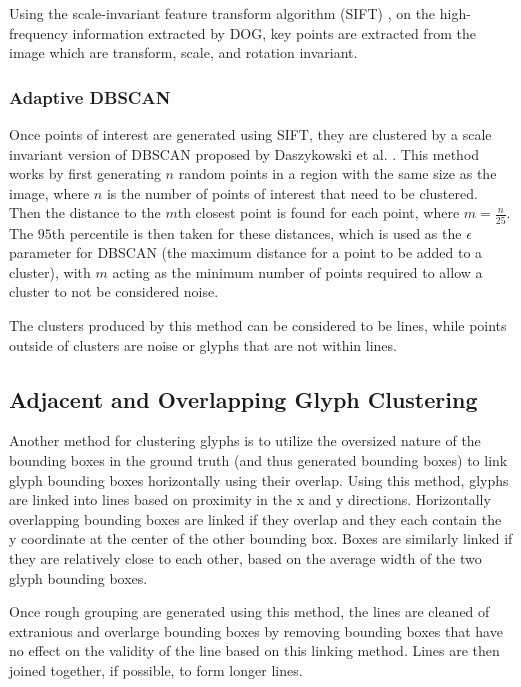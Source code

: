 Using the scale-invariant feature transform algorithm (SIFT) \cite{Lowe}, on the high-frequency information extracted by DOG, key points are extracted from the image which are transform, scale, and rotation invariant.


\subsubsection{Adaptive DBSCAN}

Once points of interest are generated using SIFT, they are clustered by a scale invariant version of DBSCAN proposed by Daszykowski et al. \cite{Daszykowski}. This method works by first generating $n$ random points in a region with the same size as the image, where $n$ is the number of points of interest that need to be clustered. Then the distance to the $m$th closest point is found for each point, where $m = \frac{n}{25}$. The $95$th percentile is then taken for these distances, which is used as the $\epsilon$ parameter for DBSCAN (the maximum distance for a point to be added to a cluster), with $m$ acting as the minimum number of points required to allow a cluster to not be considered noise.

The clusters produced by this method can be considered to be lines, while points outside of clusters are noise or glyphs that are not within lines.

\subsection{Adjacent and Overlapping Glyph Clustering}

Another method for clustering glyphs is to utilize the oversized nature of the bounding boxes in the ground truth (and thus generated bounding boxes) to link glyph bounding boxes horizontally using their overlap. Using this method, glyphs are linked into lines based on proximity in the x and y directions. Horizontally overlapping bounding boxes are linked if they overlap and they each contain the y coordinate at the center of the other bounding box. Boxes are similarly linked if they are relatively close to each other, based on the average width of the two glyph bounding boxes.

Once rough grouping are generated using this method, the lines are cleaned of extranious and overlarge bounding boxes by removing bounding boxes that have no effect on the validity of the line based on this linking method. Lines are then joined together, if possible, to form longer lines.

